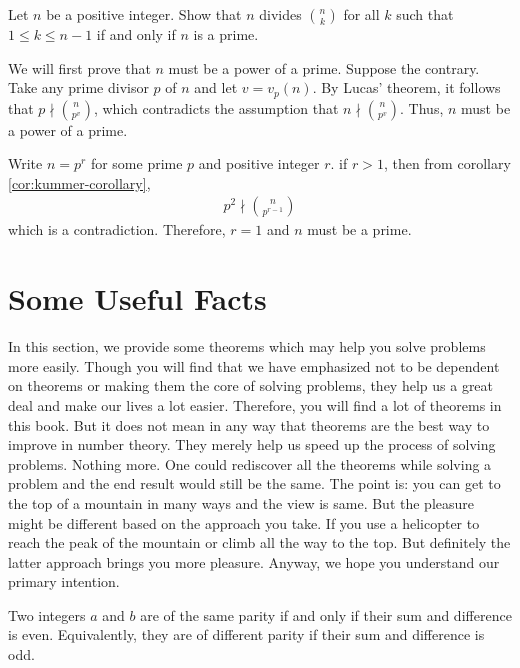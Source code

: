 \begin{problem}
Let $n$ be a positive integer. Show that $n$ divides $\binom{n}{k}$ for all $k$ such that $1 \leq k \leq n-1$ if and only if $n$ is a prime.
\end{problem}

\begin{solution}
We will first prove that $n$ must be a power of a prime. Suppose the contrary. Take any prime divisor $p$ of $n$ and let $v=v_p(n)$. By Lucas' theorem, it follows that $p \nmid\binom{n}{p^v}$, which contradicts the assumption that $n \nmid\binom{n}{p^v}$. Thus, $n$ must be a power of a prime.

Write $n=p^r$ for some prime $p$ and positive integer $r$. if $r>1$, then from corollary \ref{cor:kummer-corollary},
\begin{align*}
	p^2\nmid\binom{n}{p^{r-1}}
\end{align*}
which is a contradiction. Therefore, $r=1$ and $n$ must be a prime.

\end{solution}

\section{Some Useful Facts}\label{sec:theoremsindiv}
In this section, we provide some theorems which may help you solve problems more easily. Though you will find that we have emphasized not to be dependent on theorems or making them the core of solving problems, they help us a great deal and make our lives a lot easier. Therefore, you will find a lot of theorems in this book. But it does not mean in any way that theorems are the best way to improve in number theory. They merely help us speed up the process of solving problems. Nothing more. One could rediscover all the theorems while solving a problem and the end result would still be the same. The point is: you can get to the top of a mountain in many ways and the view is same. But the pleasure might be different based on the approach you take. If you use a helicopter to reach the peak of the mountain or climb all the way to the top. But definitely the latter approach brings you more pleasure. Anyway, we hope you understand our primary intention.

\begin{theorem}
	Two integers $a$ and $b$ are of the same parity if and only if their sum and difference is even. Equivalently, they are of different parity if their sum and difference is odd.
\end{theorem}

